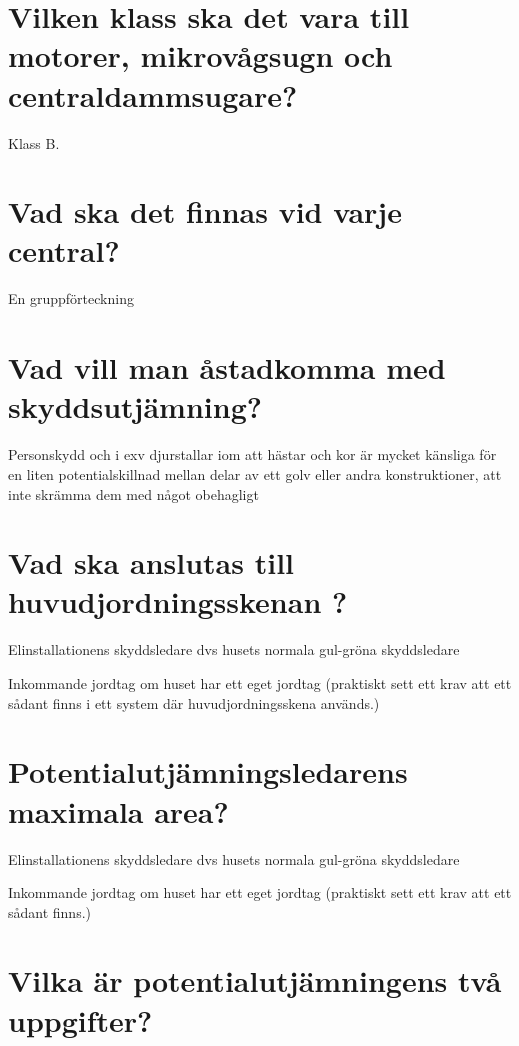 \documentclass[a4paper,swedish]{article}
\begin{document}
\setcounter{section}{15}
\section{Vilken klass ska det vara till motorer, mikrovågsugn och centraldammsugare?}\label{sec:RCD_motordrift}

Klass B.

\setcounter{section}{17}
\section{Vad ska det finnas vid varje central?}\label{sec:vad_ska_finnas_vid_en_central}

En gruppförteckning

\setcounter{section}{19}
\section{Vad vill man åstadkomma med skyddsutjämning?}\label{sec:skyddsutjamning}

Personskydd och i exv djurstallar iom att hästar och kor är mycket känsliga för en liten potentialskillnad
mellan delar av ett golv eller andra konstruktioner, att inte skrämma dem med något obehagligt


\setcounter{section}{21}
\section{Vad ska anslutas till huvudjordningsskenan ?}\label{sec:huvudjordningsskenan}

Elinstallationens skyddsledare dvs husets normala gul-gröna skyddsledare

Inkommande jordtag om huset har ett eget jordtag (praktiskt sett ett krav att ett sådant finns i ett system
där huvudjordningsskena används.)

\setcounter{section}{23}
\section{Potentialutjämningsledarens maximala area?}\label{sec:potentialutjamningarea}

Elinstallationens skyddsledare dvs husets normala gul-gröna skyddsledare

Inkommande jordtag om huset har ett eget jordtag (praktiskt sett ett krav att ett sådant finns.)

\setcounter{section}{25}
\section{Vilka är potentialutjämningens två uppgifter?}\label{sec:potentialutjamningsuppgifter}
\end{document}
